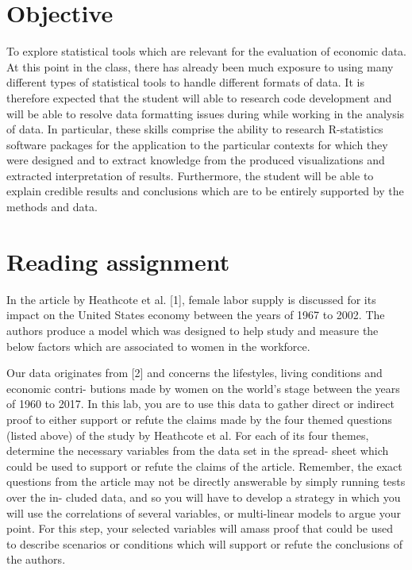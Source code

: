 \documentclass[12pt]{article}
\begin{document}
\section{Objective}

To explore statistical tools which are relevant for the evaluation of economic data. At this point in
the class, there has already been much exposure to using many different types of statistical tools to
handle different formats of data. It is therefore expected that the student will able to research code
development and will be able to resolve data formatting issues during while working in the analysis
of data. In particular, these skills comprise the ability to research R-statistics software packages for
the application to the particular contexts for which they were designed and to extract knowledge
from the produced visualizations and extracted interpretation of results. Furthermore, the student
will be able to explain credible results and conclusions which are to be entirely supported by the
methods and data.




  
\section{Reading assignment}
In the article by Heathcote et al. [1], female labor supply is discussed for its impact on the United
States economy between the years of 1967 to 2002. The authors produce a model which was designed
to help study and measure the below factors which are associated to women in the workforce.

Our data originates from [2] and concerns the lifestyles, living conditions and economic contri-
butions made by women on the world’s stage between the years of 1960 to 2017. In this lab, you
are to use this data to gather direct or indirect proof to either support or refute the claims made
by the four themed questions (listed above) of the study by Heathcote et al.
For each of its four themes, determine the necessary variables from the data set in the spread-
sheet which could be used to support or refute the claims of the article. Remember, the exact
questions from the article may not be directly answerable by simply running tests over the in-
cluded data, and so you will have to develop a strategy in which you will use the correlations of
several variables, or multi-linear models to argue your point. For this step, your selected variables will amass proof that could be used to describe scenarios or conditions which will support or refute
the conclusions of the authors.
\end{document}
